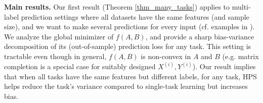 \documentclass[aos,preprint]{imsart}
\begin{document}
\medskip
\noindent\textbf{Main results.}
Our first result (Theorem \ref{thm_many_tasks}) applies to multi-label prediction settings where all datasets have the same features (and sample size), and we want to make several predictions for every input (cf. examples in \cite{hsu2009multi}).
We analyze the global minimizer of $f(A, B)$, and provide a sharp bias-variance decomposition of its (out-of-sample) prediction loss for any task.
This setting is tractable even though in general, $f(A, B)$ is non-convex in $A$ and $B$ (e.g. matrix completion is a special case for suitably designed $X^{(i)}, Y^{(i)}$).
Our result implies that when all tasks have the same features but different labels, for any task, HPS helps reduce the task's variance compared to single-task learning but increases bias.
\end{document}
